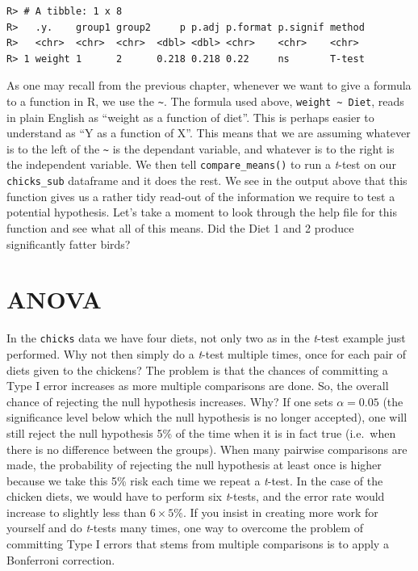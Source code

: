 \documentclass[english,10pt,a4paper,oneside]{book}
\theoremstyle{definition}
\theoremstyle{definition}
\theoremstyle{definition}
\theoremstyle{remark}
\begin{document}
\begin{verbatim}
R> # A tibble: 1 x 8
R>   .y.    group1 group2     p p.adj p.format p.signif method
R>   <chr>  <chr>  <chr>  <dbl> <dbl> <chr>    <chr>    <chr> 
R> 1 weight 1      2      0.218 0.218 0.22     ns       T-test
\end{verbatim}

As one may recall from the previous chapter, whenever we want to give a
formula to a function in R, we use the \texttt{\textasciitilde{}}. The
formula used above, \texttt{weight\ \textasciitilde{}\ Diet}, reads in
plain English as \enquote{weight as a function of diet}. This is perhaps
easier to understand as \enquote{Y as a function of X}. This means that
we are assuming whatever is to the left of the
\texttt{\textasciitilde{}} is the dependant variable, and whatever is to
the right is the independent variable. We then tell
\texttt{compare\_means()} to run a \emph{t}-test on our
\texttt{chicks\_sub} dataframe and it does the rest. We see in the
output above that this function gives us a rather tidy read-out of the
information we require to test a potential hypothesis. Let's take a
moment to look through the help file for this function and see what all
of this means. Did the Diet 1 and 2 produce significantly fatter birds?

\hypertarget{anova-1}{%
\section{ANOVA}\label{anova-1}}

In the \texttt{chicks} data we have four diets, not only two as in the
\emph{t}-test example just performed. Why not then simply do a
\emph{t}-test multiple times, once for each pair of diets given to the
chickens? The problem is that the chances of committing a Type I error
increases as more multiple comparisons are done. So, the overall chance
of rejecting the null hypothesis increases. Why? If one sets
\(\alpha=0.05\) (the significance level below which the null hypothesis
is no longer accepted), one will still reject the null hypothesis 5\% of
the time when it is in fact true (i.e.~when there is no difference
between the groups). When many pairwise comparisons are made, the
probability of rejecting the null hypothesis at least once is higher
because we take this 5\% risk each time we repeat a \emph{t}-test. In
the case of the chicken diets, we would have to perform six
\emph{t}-tests, and the error rate would increase to slightly less than
\(6\times5\%\). If you insist in creating more work for yourself and do
\emph{t}-tests many times, one way to overcome the problem of committing
Type I errors that stems from multiple comparisons is to apply a
Bonferroni correction.
\end{document}
